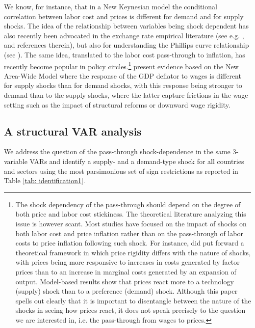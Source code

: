 \documentclass[11pt]{article}
\begin{document}
We know, for instance, that in a New Keynesian model the conditional correlation between labor cost and prices is different for demand and for supply shocks.  The idea of the relationship between variables being shock dependent has also recently been advocated in the exchange rate empirical literature (see e.g. \cite{Forbes_2018}, \cite{Comunale_Kunovac_2017} and references therein), but also for understanding the Phillips curve relationship (see \cite{Gali_Gambetti_18}). 
The same idea, translated to the labor cost pass-through to inflation, has recently become popular in policy circles.\footnote{The shock dependency of the pass-through should depend on the degree of both price and labor cost stickiness. The theoretical literature analyzing this issue is however scant. Most studies have focused on the impact of shocks on both labor cost and price inflation rather than on the pass-through of labor costs to price inflation following such shock. For instance, \cite{Bils_Chang_2000} did put forward a theoretical framework in which price rigidity differs with the nature of shocks, with prices being more responsive to increases in costs generated by factor prices than to an increase in marginal costs generated by an expansion of output. Model-based results show that prices react more to a technology (supply) shock than to a preference (demand) shock. Although this paper spells out clearly that it is important to disentangle between the nature of the shocks in seeing how prices react, it does not speak precisely to the question we are interested in, i.e. the pass-through from wages to prices.} \cite{Hahn_Gumiel_18} present evidence based on the New Area-Wide Model where the response of the GDP deflator to wages is different for supply shocks than for demand shocks, with this response being stronger to demand than to the supply shocks, where the latter capture frictions in the wage setting such as the impact of structural reforms or downward wage rigidity.

\subsection{A structural VAR analysis}
We address the question of the pass-through shock-dependence in the same 3-variable VARs and identify a supply- and a demand-type shock for all countries and sectors using the most parsimonious set of sign restrictions as reported in Table \ref{tab: identification1}. 
\end{document}
